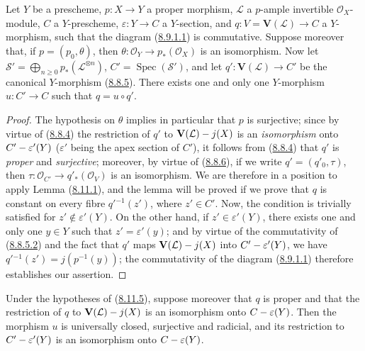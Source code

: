 \begin{lemma}[8.11.5]
\label{II.8.11.5}
Let $Y$ be a prescheme, $p:X\to Y$ a proper morphism, $\mathcal{L}$ a
$p$-ample invertible $\mathcal{O}_X$-module, $C$ a $Y$-prescheme,
$\varepsilon:Y\to C$ a $Y$-section, and
$q:V=\mathbf{V}(\mathcal{L})\to C$ a $Y$-morphism, such that the diagram
\textup{(\hyperref[II.8.9.1.1]{8.9.1.1})} is commutative. Suppose moreover that,
if $p=(p_0,\theta)$, then
$\theta:\mathcal{O}_Y\to p_*(\mathcal{O}_X)$ is an isomorphism. Now let
$\mathcal{S}'=\bigoplus_{n\geqslant0}p_*(\mathcal{L}^{\otimes n})$,
$C'=\operatorname{Spec}(\mathcal{S}')$, and let
$q':\mathbf{V}(\mathcal{L})\to C'$ be the canonical $Y$-morphism
\textup{(\hyperref[II.8.8.5]{8.8.5})}. There exists one and only one $Y$-morphism
$u:C'\to C$ such that $q=u\circ q'$.
\end{lemma}

\begin{proof}
The hypothesis on $\theta$ implies in particular that $p$ is surjective;
since by virtue of (\hyperref[II.8.8.4]{8.8.4}) the restriction of $q'$ to
$\mathbf{V}(\mathcal{L})- j(X)$ is an \emph{isomorphism} onto
$C'-\varepsilon'(Y)$ ($\varepsilon'$ being the apex section of $C'$), it
follows from (\hyperref[II.8.8.4]{8.8.4}) that $q'$ is \emph{proper} and
\emph{surjective}; moreover, by virtue of (\hyperref[II.8.8.6]{8.8.6}), if we write
$q'=(q'_0,\tau)$, then
$\tau:\mathcal{O}_{C'}\to q'_*(\mathcal{O}_V)$ is an isomorphism. We are
therefore in a position to apply Lemma
(\hyperref[II.8.11.1]{8.11.1}), and the lemma will be proved if we prove
that $q$ is constant on every fibre $q'{}^{-1}(z')$, where $z'\in C'$. Now, the
condition is trivially satisfied for $z'\notin\varepsilon'(Y)$. On the other
hand, if $z'\in\varepsilon'(Y)$, there exists one and only one $y\in Y$ such
that $z'=\varepsilon'(y)$; and by virtue of the commutativity of
(\hyperref[II.8.8.5.2]{8.8.5.2}) and the fact that $q'$ maps
$\mathbf{V}(\mathcal{L})- j(X)$ into $C'-\varepsilon'(Y)$, we have
$q'{}^{-1}(z')=j(p^{-1}(y))$; the commutativity of the diagram
(\hyperref[II.8.9.1.1]{8.9.1.1}) therefore establishes our assertion.
\end{proof}

\begin{corollary}[8.11.6]
\label{II.8.11.6}
Under the hypotheses of \textup{(\hyperref[II.8.11.5]{8.11.5})}, suppose moreover
that $q$ is proper and that the restriction of $q$ to
$\mathbf{V}(\mathcal{L})- j(X)$ is an isomorphism onto
$C-\varepsilon(Y)$. Then the morphism $u$ is universally closed,
surjective and radicial, and its restriction to $C'-\varepsilon'(Y)$ is an
isomorphism onto $C-\varepsilon(Y)$.
\end{corollary}

